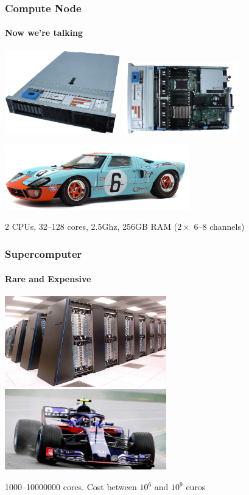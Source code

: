 \documentclass[xcolor={x11names,svgnames,psnames}]{beamer}
\begin{document}
\begin{frame}
  \frametitle{Compute Node}
  \framesubtitle{Now we're talking}
  
  \centering
  \includegraphics[width=5cm]{dell1}
  \includegraphics[width=5cm]{dell2}


  \includegraphics[width=8cm]{gt40}

  \bigskip

  2 CPUs, 32--128 cores, 2.5Ghz, 256GB RAM ($2\times$ 6--8 channels)
\end{frame}


\begin{frame}
  \frametitle{Supercomputer}
  \framesubtitle{Rare and Expensive}
  
  \centering
  \includegraphics[width=7cm]{bgp}
  \hfill
  \includegraphics[width=7cm]{f1}

  \bigskip
  
  1000--10000000 cores. Cost between $10^{6}$ and $10^{9}$ euros
\end{frame}
\end{document}
